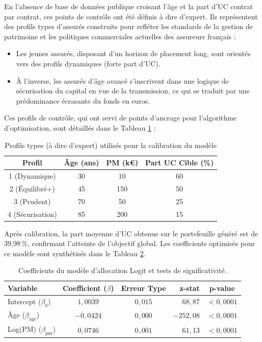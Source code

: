 En l'absence de base de données publique croisant l'âge et la part d'UC contrat par contrat, ces points de contrôle ont été définis à dire d'expert. Ils représentent des profils types d'assurés construits pour refléter les standards de la gestion de patrimoine et les politiques commerciales actuelles des assureurs français :
\begin{itemize}
    \item Les jeunes assurés, disposant d'un horizon de placement long, sont orientés vers des profils dynamiques (forte part d'UC).
    \item À l'inverse, les assurés d'âge avancé s'inscrivent dans une logique de sécurisation du capital en vue de la transmission, ce qui se traduit par une prédominance écrasante du fonds en euros.
\end{itemize}

Ces profils de contrôle, qui ont servi de points d'ancrage pour l'algorithme d'optimisation, sont détaillés dans le Tableau \ref{tab:profils_calibration} :

\begin{table}[H]
    \centering
    \caption{Profils types (à dire d'expert) utilisés pour la calibration du modèle}
    \label{tab:profils_calibration}
    \begin{tabular}{cccc}
        \toprule
        Profil & Âge (ans) & PM (k€) & Part UC Cible (\%) \\
        \midrule
        1 (Dynamique) & 30 & 10 & 60 \\
        2 (Équilibré+) & 45 & 150 & 50 \\
        3 (Prudent) & 70 & 50 & 25 \\
        4 (Sécurisation) & 85 & 200 & 15 \\
        \bottomrule
    \end{tabular}
\end{table}

Après calibration, la part moyenne d'UC obtenue sur le portefeuille généré est de 39,98\,\%, confirmant l'atteinte de l'objectif global. Les coefficients optimisés pour ce modèle sont synthétisés dans le Tableau \ref{tab:coefficients_logit}.

\begin{table}[H]
    \centering
    \begin{tabular}{|l|c|c|r|c|}
        \hline
        \textbf{Variable} & \textbf{Coefficient ($\beta$)} & \textbf{Erreur Type} & \textbf{z-stat} & \textbf{p-value} \\
        \hline
        Intercept ($\beta_0$) & $1,0039$ & $0,015$ & $68,87$ & $< 0,0001$ \\
        Âge ($\beta_{\text{age}}$) & $-0,0424$ & $0,000$ & $-252,08$ & $< 0,0001$ \\
        Log(PM) ($\beta_{\text{pm}}$) & $0,0746$ & $0,001$ & $61,13$ & $< 0,0001$ \\
        \hline
    \end{tabular}
    \caption{Coefficients du modèle d'allocation Logit et tests de significativité.}
    \label{tab:coefficients_logit}
\end{table}

